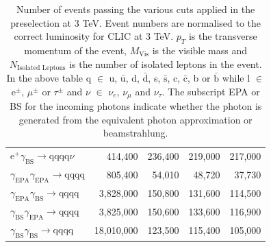 \begin{table}[h!]
\begin{tabular}{ l r r r r }
$\text{e}^{+}\gamma_{\text{BS}} \rightarrow \text{qqqq}\nu$ & 414,400 & 236,400 & 219,000 & 217,000 \\
$\gamma_{\text{EPA}}\gamma_{\text{EPA}} \rightarrow \text{qqqq}$ & 805,400 & 54,010 & 48,720 & 37,730 \\ 
$\gamma_{\text{EPA}}\gamma_{\text{BS}} \rightarrow \text{qqqq}$ & 3,828,000 & 150,800 & 131,600 & 114,500 \\ 
$\gamma_{\text{BS}}\gamma_{\text{EPA}} \rightarrow \text{qqqq}$ & 3,825,000 & 150,600 & 133,600 & 116,900 \\ 
$\gamma_{\text{BS}}\gamma_{\text{BS}} \rightarrow \text{qqqq}$ & 18,010,000 & 123,500 & 115,400 & 105,000 \\
\hline
\end{tabular}
\caption[Number of events passing the various cuts applied in the preselection at 3 TeV.]{Number of events passing the various cuts applied in the preselection at 3 TeV.  Event numbers are normalised to the correct luminosity for CLIC at 3 TeV.  $p_{T}$ is the transverse momentum of the event,  $M_{\text{Vis}}$ is the visible mass and $N_{\text{Isolated Leptons}}$ is the number of isolated leptons in the event.  In the above table q $\in$ u, $\bar{\text{u}}$, d, $\bar{\text{d}}$, s, $\bar{\text{s}}$, c, $\bar{\text{c}}$, b or $\bar{\text{b}}$ while l $\in$ $\text{e}^{\pm}$, $\mu^{\pm}$ or $\tau^{\pm}$ and $\nu$ $\in$ $\nu_{e}$, $\nu_{\mu}$ and $\nu_{\tau}$.  The subscript EPA or BS for the incoming photons indicate whether the photon is generated from the equivalent photon approximation or beamstrahlung.}
\label{table:preselectionnumbers3000GeV}
\end{table}

